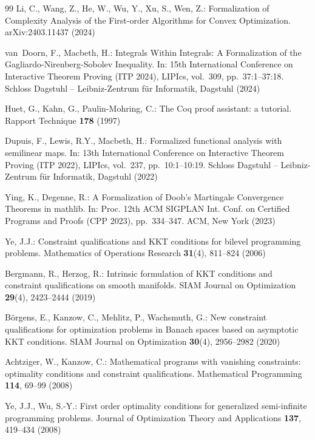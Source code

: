 \documentclass[sn-mathphys]{JORSC-jnl}%
\theoremstyle{thmstyleone}%
\theoremstyle{thmstylethree}%
\begin{document}
\begin{thebibliography}{99}
Li, C., Wang, Z., He, W., Wu, Y., Xu, S., Wen, Z.:
Formalization of Complexity Analysis of the First-order Algorithms for Convex Optimization.
arXiv:2403.11437 (2024)

van~Doorn, F., Macbeth, H.:
Integrals Within Integrals: A Formalization of the Gagliardo-Nirenberg-Sobolev Inequality.
In: 15th International Conference on Interactive Theorem Proving (ITP 2024),
LIPIcs, vol.~309, pp.~37:1--37:18.
Schloss Dagstuhl -- Leibniz-Zentrum f{\"u}r Informatik, Dagstuhl (2024)

Huet, G., Kahn, G., Paulin-Mohring, C.:
The Coq proof assistant: a tutorial.
Rapport Technique \textbf{178} (1997)

Dupuis, F., Lewis, R.Y., Macbeth, H.:
Formalized functional analysis with semilinear maps.
In: 13th International Conference on Interactive Theorem Proving (ITP 2022),
LIPIcs, vol.~237, pp.~10:1--10:19.
Schloss Dagstuhl -- Leibniz-Zentrum f{\"u}r Informatik, Dagstuhl (2022)

Ying, K., Degenne, R.:
A Formalization of Doob’s Martingale Convergence Theorems in mathlib.
In: Proc. 12th ACM SIGPLAN Int. Conf. on Certified Programs and Proofs (CPP 2023),
pp.~334--347. ACM, New York (2023)

Ye, J.J.:
Constraint qualifications and KKT conditions for bilevel programming problems.
Mathematics of Operations Research \textbf{31}(4), 811--824 (2006)

Bergmann, R., Herzog, R.:
Intrinsic formulation of KKT conditions and constraint qualifications on smooth manifolds.
SIAM Journal on Optimization \textbf{29}(4), 2423--2444 (2019)

B{\"o}rgens, E., Kanzow, C., Mehlitz, P., Wachsmuth, G.:
New constraint qualifications for optimization problems in Banach spaces based on asymptotic KKT conditions.
SIAM Journal on Optimization \textbf{30}(4), 2956--2982 (2020)

Achtziger, W., Kanzow, C.:
Mathematical programs with vanishing constraints: optimality conditions and constraint qualifications.
Mathematical Programming \textbf{114}, 69--99 (2008)

Ye, J.J., Wu, S.-Y.:
First order optimality conditions for generalized semi-infinite programming problems.
Journal of Optimization Theory and Applications \textbf{137}, 419--434 (2008)


\end{thebibliography}
\end{document}
